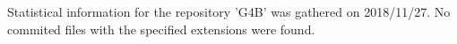 Statistical information for the repository 'G4B' was gathered on 2018/11/27.
No commited files with the specified extensions were found.
